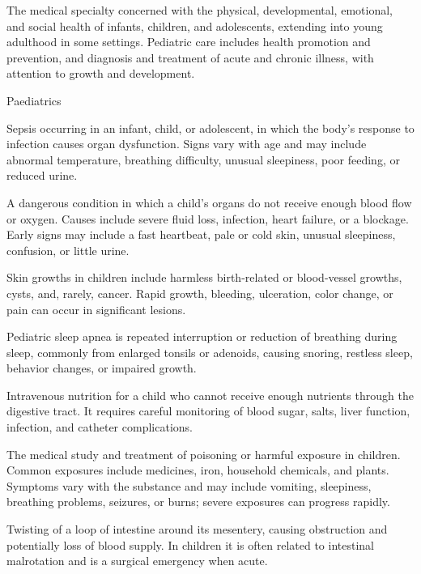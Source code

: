  The medical specialty concerned with the physical, developmental, emotional, and social
health of infants, children, and adolescents, extending into young adulthood in some settings.
Pediatric care includes health promotion and prevention, and diagnosis and treatment of
acute and chronic illness, with attention to growth and development.

\synonyms
Paediatrics

 Sepsis occurring in an infant, child, or adolescent, in which the body’s response to infection causes organ dysfunction. Signs vary with age and may include abnormal temperature, breathing difficulty, unusual sleepiness, poor feeding, or reduced urine.

 A dangerous condition in which a child’s organs do not receive enough blood flow or oxygen. Causes include severe fluid loss, infection, heart failure, or a blockage. Early signs may include a fast heartbeat, pale or cold skin, unusual sleepiness, confusion, or little urine.

 Skin growths in children include harmless birth-related or blood-vessel growths, cysts, and, rarely, cancer. Rapid growth, bleeding, ulceration, color change, or pain can occur in significant lesions.

 Pediatric sleep apnea is repeated interruption or reduction of breathing during sleep, commonly from enlarged tonsils or adenoids, causing snoring, restless sleep, behavior changes, or impaired growth.

 Intravenous nutrition for a child who cannot receive enough nutrients through the digestive tract. It requires careful monitoring of blood sugar, salts, liver function, infection, and catheter complications.

 The medical study and treatment of poisoning or harmful exposure in children. Common exposures include medicines, iron, household chemicals, and plants. Symptoms vary with the substance and may include vomiting, sleepiness, breathing problems, seizures, or burns; severe exposures can progress rapidly.

 Twisting of a loop of intestine around its mesentery, causing obstruction and potentially loss of blood supply. In children it is often related to intestinal malrotation and is a surgical emergency when acute.

